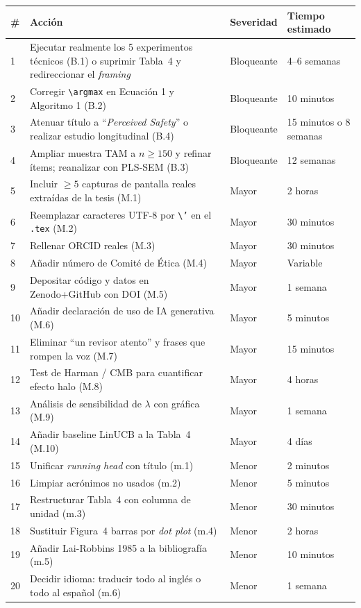 \documentclass[11pt,a4paper]{article}
\begin{document}
\begin{center}
\small
\begin{tabular}{@{}p{0.6cm}p{7.5cm}p{2.2cm}p{3cm}@{}}
\toprule
\textbf{\#} & \textbf{Acci\'on} & \textbf{Severidad} & \textbf{Tiempo estimado} \\
\midrule
1  & Ejecutar realmente los 5 experimentos t\'ecnicos (B.1) o suprimir Tabla~4 y redireccionar el \emph{framing} & Bloqueante & 4--6 semanas \\
2  & Corregir \texttt{\textbackslash argmax} en Ecuaci\'on 1 y Algoritmo 1 (B.2) & Bloqueante & 10 minutos \\
3  & Atenuar t\'itulo a ``\emph{Perceived Safety}'' o realizar estudio longitudinal (B.4) & Bloqueante & 15 minutos o 8 semanas \\
4  & Ampliar muestra TAM a $n\geq 150$ y refinar \'items; reanalizar con PLS-SEM (B.3) & Bloqueante & 12 semanas \\
5  & Incluir $\geq 5$ capturas de pantalla reales extra\'idas de la tesis (M.1) & Mayor & 2 horas \\
6  & Reemplazar caracteres UTF-8 por \texttt{\textbackslash '} en el \texttt{.tex} (M.2) & Mayor & 30 minutos \\
7  & Rellenar ORCID reales (M.3) & Mayor & 30 minutos \\
8  & A\~nadir n\'umero de Comit\'e de \'Etica (M.4) & Mayor & Variable \\
9  & Depositar c\'odigo y datos en Zenodo+GitHub con DOI (M.5) & Mayor & 1 semana \\
10 & A\~nadir declaraci\'on de uso de IA generativa (M.6) & Mayor & 5 minutos \\
11 & Eliminar ``un revisor atento'' y frases que rompen la voz (M.7) & Mayor & 15 minutos \\
12 & Test de Harman / CMB para cuantificar efecto halo (M.8) & Mayor & 4 horas \\
13 & An\'alisis de sensibilidad de $\lambda$ con gr\'afica (M.9) & Mayor & 1 semana \\
14 & A\~nadir baseline LinUCB a la Tabla~4 (M.10) & Mayor & 4 d\'ias \\
15 & Unificar \emph{running head} con t\'itulo (m.1) & Menor & 2 minutos \\
16 & Limpiar acr\'onimos no usados (m.2) & Menor & 5 minutos \\
17 & Restructurar Tabla~4 con columna de unidad (m.3) & Menor & 30 minutos \\
18 & Sustituir Figura~4 barras por \emph{dot plot} (m.4) & Menor & 2 horas \\
19 & A\~nadir Lai-Robbins 1985 a la bibliograf\'ia (m.5) & Menor & 10 minutos \\
20 & Decidir idioma: traducir todo al ingl\'es o todo al espa\~nol (m.6) & Menor & 1 semana \\
\bottomrule
\end{tabular}
\end{center}
\end{document}

